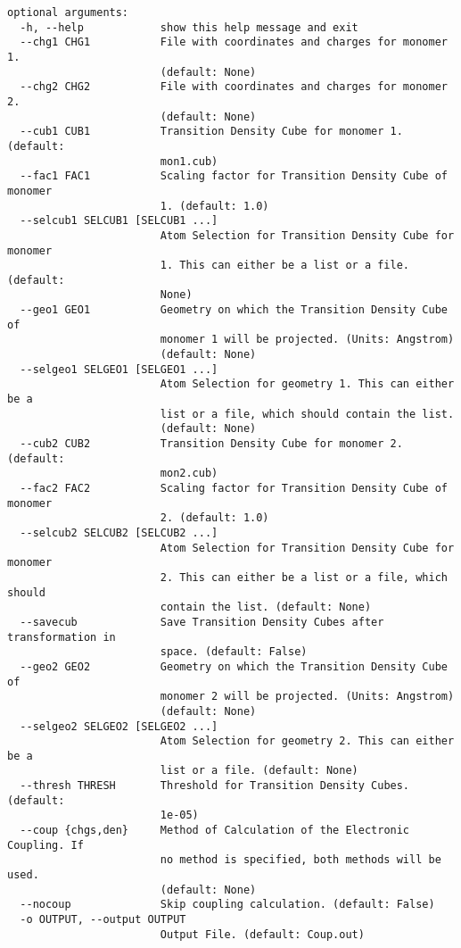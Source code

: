 \documentclass[a4paper]{article}
\begin{document}
\begin{verbatim}
optional arguments:
  -h, --help            show this help message and exit
  --chg1 CHG1           File with coordinates and charges for monomer 1.
                        (default: None)
  --chg2 CHG2           File with coordinates and charges for monomer 2.
                        (default: None)
  --cub1 CUB1           Transition Density Cube for monomer 1. (default:
                        mon1.cub)
  --fac1 FAC1           Scaling factor for Transition Density Cube of monomer
                        1. (default: 1.0)
  --selcub1 SELCUB1 [SELCUB1 ...]
                        Atom Selection for Transition Density Cube for monomer
                        1. This can either be a list or a file. (default:
                        None)
  --geo1 GEO1           Geometry on which the Transition Density Cube of
                        monomer 1 will be projected. (Units: Angstrom)
                        (default: None)
  --selgeo1 SELGEO1 [SELGEO1 ...]
                        Atom Selection for geometry 1. This can either be a
                        list or a file, which should contain the list.
                        (default: None)
  --cub2 CUB2           Transition Density Cube for monomer 2. (default:
                        mon2.cub)
  --fac2 FAC2           Scaling factor for Transition Density Cube of monomer
                        2. (default: 1.0)
  --selcub2 SELCUB2 [SELCUB2 ...]
                        Atom Selection for Transition Density Cube for monomer
                        2. This can either be a list or a file, which should
                        contain the list. (default: None)
  --savecub             Save Transition Density Cubes after transformation in
                        space. (default: False)
  --geo2 GEO2           Geometry on which the Transition Density Cube of
                        monomer 2 will be projected. (Units: Angstrom)
                        (default: None)
  --selgeo2 SELGEO2 [SELGEO2 ...]
                        Atom Selection for geometry 2. This can either be a
                        list or a file. (default: None)
  --thresh THRESH       Threshold for Transition Density Cubes. (default:
                        1e-05)
  --coup {chgs,den}     Method of Calculation of the Electronic Coupling. If
                        no method is specified, both methods will be used.
                        (default: None)
  --nocoup              Skip coupling calculation. (default: False)
  -o OUTPUT, --output OUTPUT
                        Output File. (default: Coup.out)

\end{verbatim}
\end{document}
